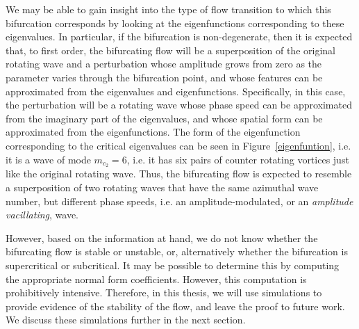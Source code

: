 We may be able to gain insight into the type of flow transition to which this bifurcation corresponds by looking at the eigenfunctions corresponding to these eigenvalues.  In particular, if the bifurcation is non-degenerate, then it is expected that, to first order, the bifurcating flow will be a superposition of the original rotating wave and a perturbation whose amplitude grows from zero as the parameter varies through the bifurcation point, and whose features can be approximated from the eigenvalues and eigenfunctions.  Specifically, in this case, the perturbation will be a rotating wave whose phase speed can be approximated from the imaginary part of the eigenvalues, and whose spatial form can be approximated from the eigenfunctions.  The form of the eigenfunction corresponding to the critical eigenvalues can be seen in Figure~\ref{eigenfuntion}, i.e. it is a wave of mode $m_{c_2} = 6$, i.e. it has six pairs of counter rotating vortices just like the original rotating wave.  Thus, the bifurcating flow is expected to resemble a superposition of two rotating waves that have the same azimuthal wave number, but different phase speeds, i.e. an amplitude-modulated, or an \emph{amplitude vacillating}, wave.

However, based on the information at hand, we do not know whether the bifurcating flow is stable or unstable, or, alternatively whether the bifurcation is supercritical or subcritical.  It may be possible to determine this by computing the appropriate normal form coefficients.  However, this computation is prohibitively intensive.  Therefore, in this thesis, we will use simulations to provide evidence of the stability of the flow, and leave the proof to future work.  We discuss these simulations further in the next section.


